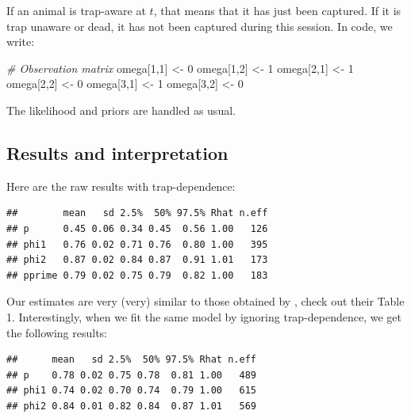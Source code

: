 \documentclass[
  12pt,
]{krantz}
\newenvironment{Shaded}{\begin{snugshade}}{\end{snugshade}}
\newcommand{\CommentTok}[1]{\textcolor[rgb]{0.56,0.35,0.01}{\textit{#1}}}
\newcommand{\DecValTok}[1]{\textcolor[rgb]{0.00,0.00,0.81}{#1}}
\newcommand{\NormalTok}[1]{#1}
\newcommand{\OtherTok}[1]{\textcolor[rgb]{0.56,0.35,0.01}{#1}}
\begin{document}
If an animal is trap-aware at \(t\), that means that it has just been captured. If it is trap unaware or dead, it has not been captured during this session. In code, we write:

\begin{Shaded}
\begin{Highlighting}[]
\CommentTok{\# Observation matrix}
\NormalTok{  omega[}\DecValTok{1}\NormalTok{,}\DecValTok{1}\NormalTok{] }\OtherTok{\textless{}{-}} \DecValTok{0}
\NormalTok{  omega[}\DecValTok{1}\NormalTok{,}\DecValTok{2}\NormalTok{] }\OtherTok{\textless{}{-}} \DecValTok{1}
\NormalTok{  omega[}\DecValTok{2}\NormalTok{,}\DecValTok{1}\NormalTok{] }\OtherTok{\textless{}{-}} \DecValTok{1}
\NormalTok{  omega[}\DecValTok{2}\NormalTok{,}\DecValTok{2}\NormalTok{] }\OtherTok{\textless{}{-}} \DecValTok{0}
\NormalTok{  omega[}\DecValTok{3}\NormalTok{,}\DecValTok{1}\NormalTok{] }\OtherTok{\textless{}{-}} \DecValTok{1}
\NormalTok{  omega[}\DecValTok{3}\NormalTok{,}\DecValTok{2}\NormalTok{] }\OtherTok{\textless{}{-}} \DecValTok{0}
\end{Highlighting}
\end{Shaded}

The likelihood and priors are handled as usual.

\subsection{Results and interpretation}\label{results-and-interpretation-3}

Here are the raw results with trap-dependence:

\begin{verbatim}
##        mean   sd 2.5%  50% 97.5% Rhat n.eff
## p      0.45 0.06 0.34 0.45  0.56 1.00   126
## phi1   0.76 0.02 0.71 0.76  0.80 1.00   395
## phi2   0.87 0.02 0.84 0.87  0.91 1.01   173
## pprime 0.79 0.02 0.75 0.79  0.82 1.00   183
\end{verbatim}

Our estimates are very (very) similar to those obtained by \citet{pradeltrapdep2012}, check out their Table 1. Interestingly, when we fit the same model by ignoring trap-dependence, we get the following results:

\begin{verbatim}
##      mean   sd 2.5%  50% 97.5% Rhat n.eff
## p    0.78 0.02 0.75 0.78  0.81 1.00   489
## phi1 0.74 0.02 0.70 0.74  0.79 1.00   615
## phi2 0.84 0.01 0.82 0.84  0.87 1.01   569
\end{verbatim}
\end{document}
